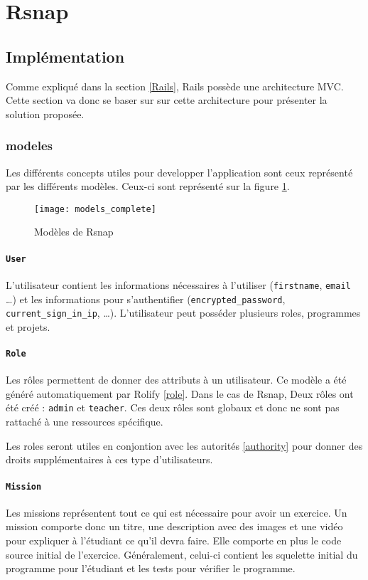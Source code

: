 \section{Rsnap}
\graphicspath{{content/7-solution/3-rsnap/images/}}
\subsection{Implémentation}
Comme expliqué dans la section \ref{Rails}, Rails possède une architecture MVC. Cette section va donc se baser sur sur cette architecture pour présenter la solution proposée.

\subsubsection{modeles}
Les différents concepts utiles pour developper l'application sont ceux représenté par les différents modèles. Ceux-ci sont représenté sur la figure \ref{fig:models}.
\begin{figure}
  \begin{center}
    \texttt{[image: models\_complete]}
    \caption{Modèles de Rsnap}
    \label{fig:models}
  \end{center}
\end{figure}
\paragraph{\texttt{User}} L'utilisateur contient les informations nécessaires à l'utiliser (\texttt{firstname}, \texttt{email} \ldots) et les informations pour s'authentifier (\texttt{encrypted\_password}, \texttt{current\_sign\_in\_ip}, \ldots). L'utilisateur peut posséder plusieurs roles, programmes et projets.
\paragraph{\texttt{Role}} Les rôles permettent de donner des attributs à un utilisateur. Ce modèle a été généré automatiquement par Rolify \ref{role}. Dans le cas de Rsnap, Deux rôles ont été créé : \texttt{admin} et \texttt{teacher}. Ces deux rôles sont globaux et donc ne sont pas rattaché à une ressources spécifique.%

Les roles seront utiles en conjontion avec les autorités \ref{authority} pour donner des droits supplémentaires à ces type d'utilisateurs.
\paragraph{\texttt{Mission}} Les missions représentent tout ce qui est nécessaire pour avoir un exercice. Un mission comporte donc un titre, une description avec des images et une vidéo pour expliquer à l'étudiant ce qu'il devra faire. Elle comporte en plus le code source initial de l'exercice. Généralement, celui-ci contient les squelette initial du programme pour l'étudiant et les tests pour vérifier le programme. 
